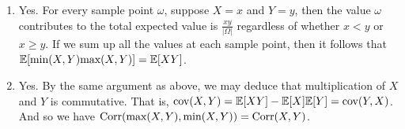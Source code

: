 \begin{enumerate}
\begin{enumerate}
        \item Yes. For every sample point $\omega$, suppose $X = x$ and $Y = y$, then the value $\omega$ contributes to the total expected value is $\frac{xy}{|\Omega|}$ regardless of whether $x < y$ or $x \geq y$. If we sum up all the values at each sample point, then it follows that $\mathbb{E}[\text{min}(X, Y)\text{max}(X, Y)] = \mathbb{E}[XY]$.
        
        \item Yes. By the same argument as above, we may deduce that multiplication of $X$ and $Y$ is commutative. That is, $\text{cov}(X, Y) = \mathbb{E}[XY] - \mathbb{E}[X]\mathbb{E}[Y] = \text{cov}(Y, X)$. And so we have $\text{Corr}(\text{max}(X, Y), \text{min}(X, Y)) = \text{Corr}(X, Y)$.
    \end{enumerate}
\end{enumerate}